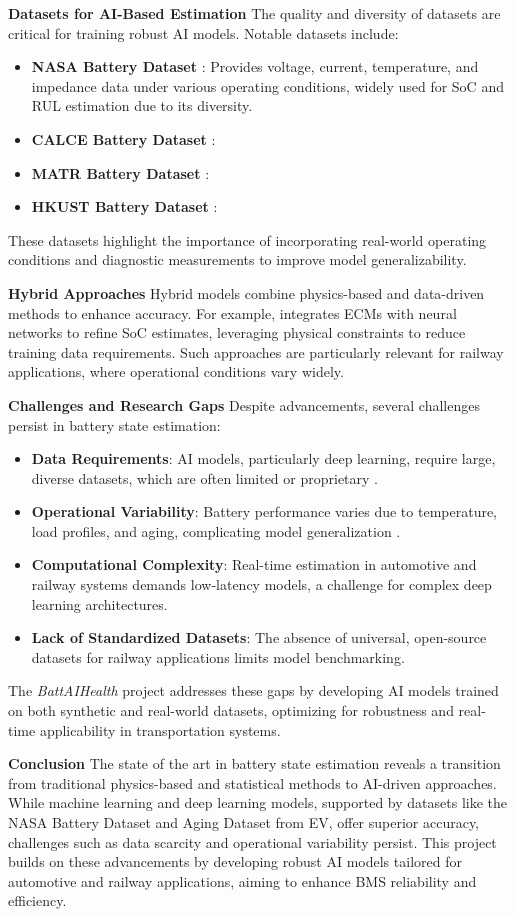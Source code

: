 \textbf{Datasets for AI-Based Estimation}
The quality and diversity of datasets are critical for training robust AI models. Notable datasets include:
\begin{itemize}
    \item \textbf{NASA Battery Dataset} \cite{noauthor_nasa_nodate}: Provides voltage, current, temperature, and impedance data under various operating conditions, widely used for SoC and RUL estimation due to its diversity.
    \item \textbf{CALCE Battery Dataset} \cite{CALCE_battery_nodate}:
    \item \textbf{MATR Battery Dataset} \cite{MATR_dataset_nodate}: 
    \item \textbf{HKUST Battery Dataset} \cite{pepe_hkust_nodate}: 
\end{itemize}
These datasets highlight the importance of incorporating real-world operating conditions and diagnostic measurements to improve model generalizability.


\textbf{Hybrid Approaches}
Hybrid models combine physics-based and data-driven methods to enhance accuracy. For example, \cite{} integrates ECMs with neural networks to refine SoC estimates, leveraging physical constraints to reduce training data requirements. Such approaches are particularly relevant for railway applications, where operational conditions vary widely.


\textbf{Challenges and Research Gaps}
Despite advancements, several challenges persist in battery state estimation:
\begin{itemize}
    \item \textbf{Data Requirements}: AI models, particularly deep learning, require large, diverse datasets, which are often limited or proprietary .
    \item \textbf{Operational Variability}: Battery performance varies due to temperature, load profiles, and aging, complicating model generalization .
    \item \textbf{Computational Complexity}: Real-time estimation in automotive and railway systems demands low-latency models, a challenge for complex deep learning architectures.
    \item \textbf{Lack of Standardized Datasets}: The absence of universal, open-source datasets for railway applications limits model benchmarking.
\end{itemize}
The \textit{BattAIHealth} project addresses these gaps by developing AI models trained on both synthetic and real-world datasets, optimizing for robustness and real-time applicability in transportation systems.

\textbf{Conclusion}
The state of the art in battery state estimation reveals a transition from traditional physics-based and statistical methods to AI-driven approaches. While machine learning and deep learning models, supported by datasets like the NASA Battery Dataset and Aging Dataset from EV, offer superior accuracy, challenges such as data scarcity and operational variability persist. This project builds on these advancements by developing robust AI models tailored for automotive and railway applications, aiming to enhance BMS reliability and efficiency.